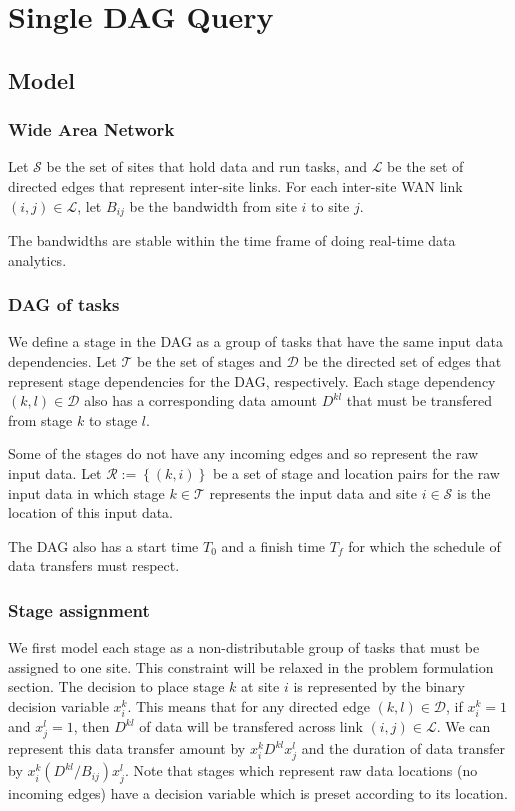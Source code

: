 \section{Single DAG Query}

\subsection{Model}

\subsubsection*{Wide Area Network}

Let $\mathcal{S}$ be the set of sites that hold data and run tasks, and $\mathcal{L}$ be the set of directed edges that represent inter-site links.
For each inter-site WAN link $(i,j)\in\mathcal{L}$, let $B_{ij}$ be the bandwidth from site $i$ to site $j$.
\begin{assumption}
	The bandwidths are stable within the time frame of doing real-time data analytics.
\end{assumption} 

\subsubsection*{DAG of tasks}

We define a stage in the DAG as a group of tasks that have the same input data dependencies.
Let $\mathcal{T}$ be the set of stages and $\mathcal{D}$ be the directed set of edges that represent stage dependencies for the DAG, respectively.
Each stage dependency $(k,l)\in\mathcal{D}$ also has a corresponding data amount $D^{kl}$ that must be transfered from stage $k$ to stage $l$.

Some of the stages do not have any incoming edges and so represent the raw input data.
Let $\mathcal{R}:=\left\{(k,i)\right\}$ be a set of stage and location pairs for the raw input data in which stage $k\in\mathcal{T}$ represents the input data and site $i\in\mathcal{S}$ is the location of this input data.

The DAG also has a start time $T_0$ and a finish time $T_f$ for which the schedule of data transfers must respect.

\subsubsection*{Stage assignment}

We first model each stage as a non-distributable group of tasks that must be assigned to one site.
This constraint will be relaxed in the problem formulation section.
The decision to place stage $k$ at site $i$ is represented by the binary decision variable $x_i^k$.
This means that for any directed edge $(k,l)\in\mathcal{D}$, if $x_i^k=1$ and $x_j^l=1$, then $D^{kl}$ of data will be transfered across link $(i,j)\in\mathcal{L}$.
We can represent this data transfer amount by $x_i^kD^{kl}x_j^l$ and the duration of data transfer by $x_i^k(D^{kl}/B_{ij})x_j^l$.
Note that stages which represent raw data locations (no incoming edges) have a decision variable which is preset according to its location.

